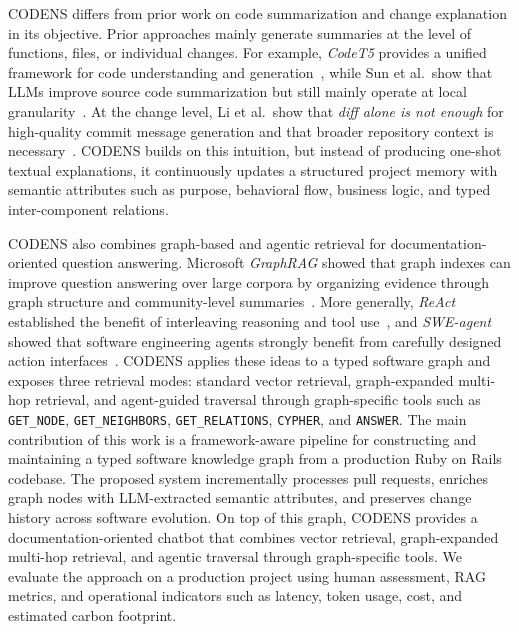 \documentclass[sigconf]{acmart}
\begin{document}
CODENS differs from prior work on code summarization and change explanation in its objective. 
Prior approaches mainly generate summaries at the level of functions, files, or individual changes. 
For example, \emph{CodeT5} provides a unified framework for code understanding and generation~\cite{Wang2021CodeT5}, while Sun et al.\ show that LLMs improve source code summarization but still mainly operate at local granularity~\cite{Sun2025CodeSummarization}. 
At the change level, Li et al.\ show that \emph{diff alone is not enough} for high-quality commit message generation and that broader repository context is necessary~\cite{Li2024OnlyDiff}. 
CODENS builds on this intuition, but instead of producing one-shot textual explanations, it continuously updates a structured project memory with semantic attributes such as purpose, behavioral flow, business logic, and typed inter-component relations.

CODENS also combines graph-based and agentic retrieval for documentation-oriented question answering. 
Microsoft \emph{GraphRAG} showed that graph indexes can improve question answering over large corpora by organizing evidence through graph structure and community-level summaries~\cite{Edge2024GraphRAG}. 
More generally, \emph{ReAct} established the benefit of interleaving reasoning and tool use~\cite{Yao2023ReAct}, and \emph{SWE-agent} showed that software engineering agents strongly benefit from carefully designed action interfaces~\cite{Yang2024SWEAgent}. 
CODENS applies these ideas to a typed software graph and exposes three retrieval modes: standard vector retrieval, graph-expanded multi-hop retrieval, and agent-guided traversal through graph-specific tools such as \texttt{GET\_NODE}, \texttt{GET\_NEIGHBORS}, \texttt{GET\_RELATIONS}, \texttt{CYPHER}, and \texttt{ANSWER}. The main contribution of this work is a framework-aware pipeline for constructing and maintaining a typed software knowledge graph from a production Ruby on Rails codebase. The proposed system incrementally processes pull requests, enriches graph nodes with LLM-extracted semantic attributes, and preserves change history across software evolution. On top of this graph, CODENS provides a documentation-oriented chatbot that combines vector retrieval, graph-expanded multi-hop retrieval, and agentic traversal through graph-specific tools. We evaluate the approach on a production project using human assessment, RAG metrics, and operational indicators such as latency, token usage, cost, and estimated carbon footprint.
\end{document}
